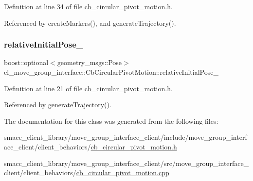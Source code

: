 Definition at line 34 of file cb\+\_\+circular\+\_\+pivot\+\_\+motion.\+h.



Referenced by create\+Markers(), and generate\+Trajectory().

\mbox{\label{classcl__move__group__interface_1_1CbCircularPivotMotion_a1b2cc65d2f27a4dec54c20f1f00d4bb8}} 
\subsubsection{\texorpdfstring{relative\+Initial\+Pose\+\_\+}{relativeInitialPose\_}}
{\footnotesize\ttfamily boost\+::optional$<$geometry\+\_\+msgs\+::\+Pose$>$ cl\+\_\+move\+\_\+group\+\_\+interface\+::\+Cb\+Circular\+Pivot\+Motion\+::relative\+Initial\+Pose\+\_\+}



Definition at line 21 of file cb\+\_\+circular\+\_\+pivot\+\_\+motion.\+h.



Referenced by generate\+Trajectory().



The documentation for this class was generated from the following files\+:\begin{DoxyCompactItemize}
\item 
smacc\+\_\+client\+\_\+library/move\+\_\+group\+\_\+interface\+\_\+client/include/move\+\_\+group\+\_\+interface\+\_\+client/client\+\_\+behaviors/\hyperlink{cb__circular__pivot__motion_8h}{cb\+\_\+circular\+\_\+pivot\+\_\+motion.\+h}\item 
smacc\+\_\+client\+\_\+library/move\+\_\+group\+\_\+interface\+\_\+client/src/move\+\_\+group\+\_\+interface\+\_\+client/client\+\_\+behaviors/\hyperlink{cb__circular__pivot__motion_8cpp}{cb\+\_\+circular\+\_\+pivot\+\_\+motion.\+cpp}\end{DoxyCompactItemize}
